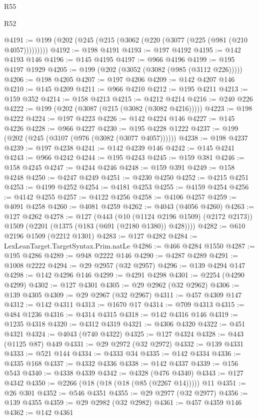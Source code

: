 \begin{lexlean}{R55}
\begin{lexlean}{R52}
\begin{coremodule}
{{{{{{{{{{{{{{{{{{{{{{{{{{{{{{{{{{{{{{{{{{{{{{{{{{{{{{{{{{{{{{{{{{{{{{{{{{{{{{{{{{{{{{{{{{{{{{{{{{{{{{{{{{{{{{{{{{{{{{{{{{{{{{{{{{{{{{{{{{{{{{{{{{{{{{{{{{{{{{{{{{{{{{{{{{{{{{{{{{{{{{{{{{{{{{{{{{{{{{@4191 := @199 (@202 (@245 (@215 (@3062 (@220 (@3077 (@225 (@981 (@210 @4057)))))))))
@4192 := @198 @4191
@4193 := @197 @4192
@4195 := @142 @4193 @146
@4196 := @145 @4195
@4197 := @966 @4196
@4199 := @195 @4197 @1929
@4205 := @199 (@202 (@3052 (@3082 (@985 (@3112 @226)))))
@4206 := @198 @4205
@4207 := @197 @4206
@4209 := @142 @4207 @146
@4210 := @145 @4209
@4211 := @966 @4210
@4212 := @195 @4211
@4213 := @159 @352
@4214 := @158 @4213
@4215 := @4212 @4214
@4216 := @240 @226
@4222 := @199 (@202 (@3087 (@215 (@3082 (@3082 @4216)))))
@4223 := @198 @4222
@4224 := @197 @4223
@4226 := @142 @4224 @146
@4227 := @145 @4226
@4228 := @966 @4227
@4230 := @195 @4228 @1222
@4237 := @199 (@202 (@245 (@3107 (@976 (@3082 (@3077 @4057))))))
@4238 := @198 @4237
@4239 := @197 @4238
@4241 := @142 @4239 @146
@4242 := @145 @4241
@4243 := @966 @4242
@4244 := @195 @4243
@4245 := @159 @381
@4246 := @158 @4245
@4247 := @4244 @4246
@4248 := @159 @391
@4249 := @158 @4248
@4250 := @4247 @4249
@4251 := @4230 @4250
@4252 := @4215 @4251
@4253 := @4199 @4252
@4254 := @4181 @4253
@4255 := @4159 @4254
@4256 := @4142 @4255
@4257 := @4122 @4256
@4258 := @4106 @4257
@4259 := @4091 @4258
@4260 := @4081 @4259
@4262 := @4043 (@4056 @4260)
@4263 := @127 @4262
@4278 := @127
    (@443
      (@10 (@1124 @2196 @1509) (@2172 @2173))
      @1509
      (@2201 (@1375 (@183 (@691 (@2180 @1380)) @428))))
@4282 := @610 @2196 @1509 (@2212 @1301)
@4283 := @127 @4282
@4284 := LexLeanTarget.TargetSyntax.Prim.natLe
@4286 := @466 @4284 @1550
@4287 := @195 @4286
@4289 := @948 @2222 @146
@4290 := @4287 @4289
@4291 := @1008 @2222
@4294 := @29 @2957 (@32 @2957)
@4296 := @139 @4294 @147
@4298 := @142 @4296 @146
@4299 := @4291 @4298
@4301 := @2254 (@4290 @4299)
@4302 := @127 @4301
@4305 := @29 @2962 (@32 @2962)
@4306 := @139 @4305
@4309 := @29 @2967 (@32 @2967)
@4311 := @457 @4309 @147
@4312 := @142 @4311
@4313 := @1670 @17
@4314 := @709 @4313
@4315 := @484 @1236
@4316 := @4314 @4315
@4318 := @142 @4316 @146
@4319 := @1235 @4318
@4320 := @4312 @4319
@4321 := @4306 @4320
@4322 := @451 @4321
@4324 := @4043 (@740 @4322)
@4325 := @127 @4324
@4328 := @443 (@1125 @87) @449
@4331 := @29 @2972 (@32 @2972)
@4332 := @139 @4331
@4333 := @521 @144
@4334 := @4333 @34
@4335 := @142 @4334
@4336 := @4335 @168
@4337 := @4332 @4336
@4338 := @142 @4337
@4339 := @156 @543
@4340 := @4338 @4339
@4342 := @4328 (@476 @4340)
@4343 := @127 @4342
@4350 := @2266 (@18 (@18 (@18 (@85 (@2267 @14))))) @11
@4351 := @26 @301
@4352 := @546 @4351
@4355 := @29 @2977 (@32 @2977)
@4356 := @139 @4355
@4359 := @29 @2982 (@32 @2982)
@4361 := @457 @4359 @146
@4362 := @142 @4361
}}}}}}}}}}}}}}}}}}}}}}}}}}}}}}}}}}}}}}}}}}}}}}}}}}}}}}}}}}}}}}}}}}}}}}}}}}}}}}}}}}}}}}}}}}}}}}}}}}}}}}}}}}}}}}}}}}}}}}}}}}}}}}}}}}}}}}}}}}}}}}}}}}}}}}}}}}}}}}}}}}}}}}}}}}}}}}}}}}}}}}}}}}}}}}}}}}}}}}
\end{coremodule}
\end{lexlean}
\end{lexlean}
